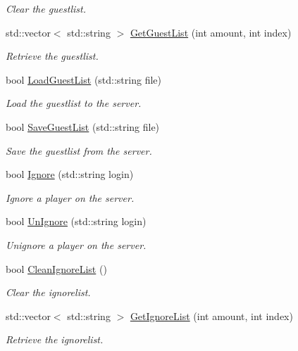 \begin{DoxyCompactItemize}
\begin{DoxyCompactList}\small\item\em Clear the guestlist. \end{DoxyCompactList}\item 
std\-::vector$<$ std\-::string $>$ \hyperlink{classMethods_a82c204736e55479609c3f045f619aae0}{Get\-Guest\-List} (int amount, int index)
\begin{DoxyCompactList}\small\item\em Retrieve the guestlist. \end{DoxyCompactList}\item 
bool \hyperlink{classMethods_a2688fe2a81de0b0816802607808f644d}{Load\-Guest\-List} (std\-::string file)
\begin{DoxyCompactList}\small\item\em Load the guestlist to the server. \end{DoxyCompactList}\item 
bool \hyperlink{classMethods_a3e73ac8d0dfee50e3db46fcf93ac7fd2}{Save\-Guest\-List} (std\-::string file)
\begin{DoxyCompactList}\small\item\em Save the guestlist from the server. \end{DoxyCompactList}\item 
bool \hyperlink{classMethods_a23af00f26e1ab1d97f42d527d8c41006}{Ignore} (std\-::string login)
\begin{DoxyCompactList}\small\item\em Ignore a player on the server. \end{DoxyCompactList}\item 
bool \hyperlink{classMethods_a582b57b07d3f792e5e4802c12a9955f1}{Un\-Ignore} (std\-::string login)
\begin{DoxyCompactList}\small\item\em Unignore a player on the server. \end{DoxyCompactList}\item 
\hypertarget{classMethods_a8394052dffa0a9ff24d94916386ed1ab}{bool \hyperlink{classMethods_a8394052dffa0a9ff24d94916386ed1ab}{Clean\-Ignore\-List} ()}\label{classMethods_a8394052dffa0a9ff24d94916386ed1ab}

\begin{DoxyCompactList}\small\item\em Clear the ignorelist. \end{DoxyCompactList}\item 
std\-::vector$<$ std\-::string $>$ \hyperlink{classMethods_a0ce37b940aa81f733a831776d420d4a2}{Get\-Ignore\-List} (int amount, int index)
\begin{DoxyCompactList}\small\item\em Retrieve the ignorelist. \end{DoxyCompactList}\end{DoxyCompactItemize}
